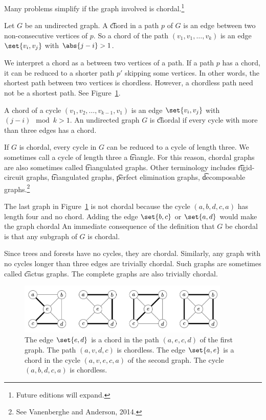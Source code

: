 

Many problems simplify if the graph involved is chordal.\footnote{Future editions will expand.}


Let $G$ be an undirected graph.
A \t{chord} in a path $p$ of $G$ is an edge between two non-consecutive vertices of $p$.
So a chord of the path $(v_1, v_1, \dots, v_{k})$ is an edge $\set{v_i, v_j}$ with $\abs{j - i} > 1$.

We interpret a chord as a  between two vertices of a path.
If a path $p$ has a chord, it can be reduced to a shorter path $p'$ skipping some vertices.
In other words, the shortest path between two vertices is chordless.
However, a chordless path need not be a shortest path.
See Figure~\ref{figure:chordal_graphs:chords}.


A chord of a cycle $(v_1, v_2, \dots, v_{k-1}, v_1)$ is an edge $\set{v_i, v_j}$ with $(j - i) \mod k > 1$.
An undirected graph $G$ is \t{chordal} if every cycle with more than three edges has a chord.

If $G$ is chordal, every cycle in $G$ can be reduced to a cycle of length three.
We sometimes call a cycle of length three a \t{triangle}.
For this reason, chordal graphs are also sometimes called \t{triangulated graphs}.
Other terminology includes \t{rigid-circuit graphs}, \t{triangulated graphs}, \t{perfect elimination graphs}, \t{decomposable graphs}.\footnote{See Vanenberghe and Anderson, 2014.}

The last graph in Figure~\ref{figure:chordal_graphs:chords} is not chordal because the cycle $(a, b, d, c, a)$ has length four and no chord.
Adding the edge $\set{b, c}$ or $\set{a, d}$ would make the graph chordal
An immediate consequence of the definition that $G$ be chordal is that any subgraph of $G$ is chordal.



Since trees and forests have no cycles, they are chordal.
Similarly, any graph with no cycles longer than three edges are trivially chordal.
Such graphs are sometimes called \t{cactus graphs}.
The complete graphs are also trivially chordal.

\begin{figure}
  \centering
  \includegraphics[width=0.9\textwidth]{graphics_included/chords}
  \caption{
  The edge $\set{e, d}$ is a chord in the path $(a, e, c, d)$ of the first graph. The path $(a, v, d, c)$ is chordless.
  The edge $\set{a, e}$ is a chord in the cycle $(a, v, e, c, a)$ of the second graph.
  The cycle $(a, b, d, c, a)$ is chordless.
  }
  \label{figure:chordal_graphs:chords}
\end{figure}
